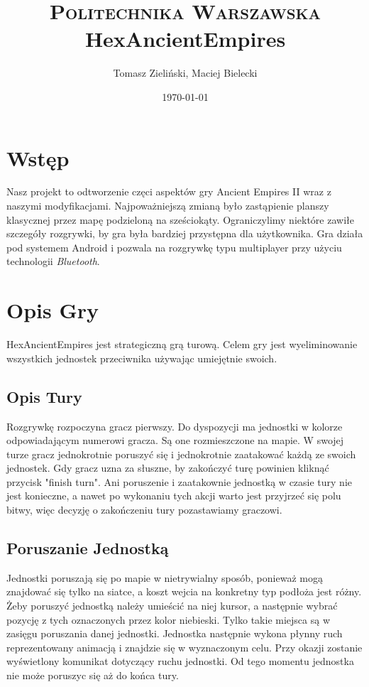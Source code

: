 \documentclass[paper=a4, fontsize=11pt]{scrartcl} %
\title{	
\normalfont \normalsize 
\textsc{Politechnika Warszawska} \\ [25pt] %
\huge HexAncientEmpires \\ %
}
\author{Tomasz Zieliński,  Maciej Bielecki}
\date{\normalsize\today}
\numberwithin{equation}{section} %
\numberwithin{figure}{section} %
\numberwithin{table}{section} %
\begin{document}
\maketitle 

\section{Wstęp}
Nasz projekt to odtworzenie częci aspektów gry Ancient Empires II wraz z naszymi modyfikacjami. Najpoważniejszą zmianą było zastąpienie planszy klasycznej przez mapę podzieloną na sześciokąty. Ograniczylimy niektóre zawiłe szczegóły rozgrywki, by gra była bardziej przystępna dla użytkownika. Gra działa pod systemem Android i pozwala na rozgrywkę typu multiplayer przy użyciu technologii \textit{Bluetooth}.

\section{Opis Gry}
HexAncientEmpires jest strategiczną grą turową. Celem gry jest wyeliminowanie wszystkich jednostek przeciwnika używając umiejętnie swoich.
\subsection{Opis Tury}
Rozgrywkę rozpoczyna gracz pierwszy. Do dyspozycji ma jednostki w kolorze odpowiadającym numerowi gracza. Są one rozmieszczone na mapie.
 W swojej turze gracz jednokrotnie poruszyć się i jednokrotnie zaatakować każdą ze swoich jednostek. Gdy gracz uzna za słuszne, by zakończyć turę powinien kliknąć przycisk "finish turn". Ani poruszenie i zaatakownie jednostką w czasie tury nie jest konieczne, a nawet po wykonaniu tych akcji warto jest przyjrzeć się polu bitwy, więc decyzję o zakończeniu tury pozastawiamy graczowi. 
\subsection{Poruszanie Jednostką}
Jednostki poruszają się po mapie w nietrywialny sposób, ponieważ mogą znajdować się tylko na siatce, a koszt wejcia na konkretny typ podłoża jest różny. Żeby poruszyć jednostką należy umieścić na niej kursor, a następnie wybrać pozycję z tych oznaczonych przez kolor niebieski. Tylko takie miejsca są w zasięgu poruszania danej jednostki. Jednostka następnie wykona płynny ruch reprezentowany animacją i znajdzie się w wyznaczonym celu. Przy okazji zostanie wyświetlony komunikat dotyczący ruchu jednostki. Od tego momentu jednostka nie może poruszyc się aż do końca tury. 
\end{document}
